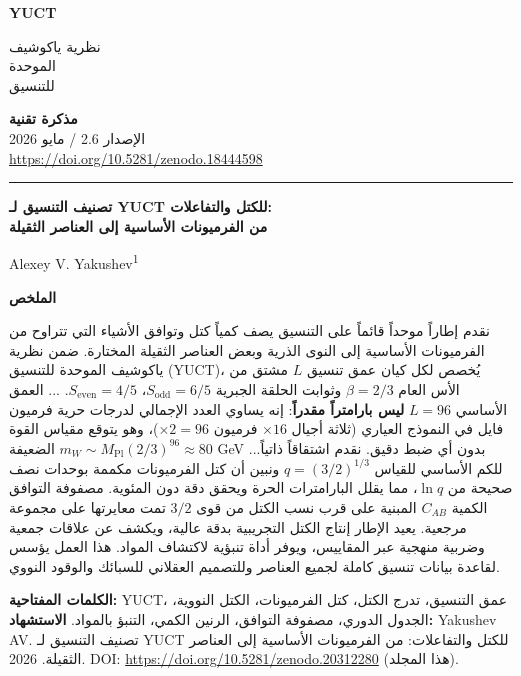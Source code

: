\documentclass[11pt,a4paper]{article}
\newcommand{\makeheader}{%
	\noindent
	\begin{minipage}{0.17\textwidth}
		\raggedright
		{\sffamily\bfseries\color{skyblue}\fontsize{46}{46}\selectfont YUCT}%
	\end{minipage}%
	\hspace{30pt}
	\begin{minipage}{0.32\textwidth}
		\raggedright
		{\sffamily\fontsize{11}{13}\selectfont نظرية ياكوشيف\\ الموحدة\\ للتنسيق}%
	\end{minipage}%
	\hfill
	\begin{minipage}{0.38\textwidth}
		\raggedleft
		{\sffamily\bfseries مذكرة تقنية}\\ 
		{\sffamily الإصدار 2.6 / مايو 2026}\\ 
		{\sffamily\footnotesize \url{https://doi.org/10.5281/zenodo.18444598}}%
	\end{minipage}
	\par\vspace{5pt}
	\noindent\textcolor{gold}{\rule{\textwidth}{1.6pt}}
	\par\vspace{0pt}
}
\begin{document}
	\thispagestyle{firstpage}
	\makeheader
	
	\vspace{0cm}
	{\LARGE\bfseries تصنيف التنسيق لـ YUCT للكتل والتفاعلات:\\ 
		\Large من الفرميونات الأساسية إلى العناصر الثقيلة \par}
	\vspace{0.2cm}
	
	{\large Alexey V. Yakushev\textsuperscript{1}} \\
	\vspace{0.0cm}
	
	{\color{darkblue}\textbf{\LARGE الملخص}} \par
	{\large
		\noindent
		نقدم إطاراً موحداً قائماً على التنسيق يصف كمياً كتل وتوافق الأشياء التي تتراوح من الفرميونات الأساسية إلى النوى الذرية وبعض العناصر الثقيلة المختارة. ضمن نظرية ياكوشيف الموحدة للتنسيق (YUCT)، يُخصص لكل كيان عمق تنسيق \(L\) مشتق من الأس العام \(\beta = 2/3\) وثوابت الحلقة الجبرية \(S_{\mathrm{odd}}=6/5\)، \(S_{\mathrm{even}}=4/5\). ... العمق الأساسي \(L=96\) \textbf{ليس بارامتراً مقدراً}: إنه يساوي العدد الإجمالي لدرجات حرية فرميون فايل في النموذج العياري (ثلاثة أجيال $\times 16$ فرميون $\times 2 = 96$)، وهو يتوقع مقياس القوة الضعيفة \(m_W \sim M_{\mathrm{Pl}}(2/3)^{96} \approx 80\) GeV بدون أي ضبط دقيق. نقدم اشتقاقاً ذاتياً... للكم الأساسي للقياس \(q = (3/2)^{1/3}\) ونبين أن كتل الفرميونات مكممة بوحدات نصف صحيحة من \(\ln q\)، مما يقلل البارامترات الحرة ويحقق دقة دون المئوية. مصفوفة التوافق الكمية \(C_{AB}\) المبنية على قرب نسب الكتل من قوى \(3/2\) تمت معايرتها على مجموعة مرجعية. يعيد الإطار إنتاج الكتل التجريبية بدقة عالية، ويكشف عن علاقات جمعية وضربية منهجية عبر المقاييس، ويوفر أداة تنبؤية لاكتشاف المواد. هذا العمل يؤسس لقاعدة بيانات تنسيق كاملة لجميع العناصر وللتصميم العقلاني للسبائك والوقود النووي.}
	
	\vspace{0.1cm}
	\noindent
	{\color{darkblue}\textbf{الكلمات المفتاحية:}} YUCT، عمق التنسيق، تدرج الكتل، كتل الفرميونات، الكتل النووية، الجدول الدوري، مصفوفة التوافق، الرنين الكمي، التنبؤ بالمواد.
	\vspace{0.1cm}
	\noindent
	{\color{darkblue}\textbf{الاستشهاد:}} Yakushev AV. تصنيف التنسيق لـ YUCT للكتل والتفاعلات: من الفرميونات الأساسية إلى العناصر الثقيلة. 2026. DOI: \url{https://doi.org/10.5281/zenodo.20312280} (هذا المجلد).
	
	\vspace{0.4cm}
	
\end{document}
